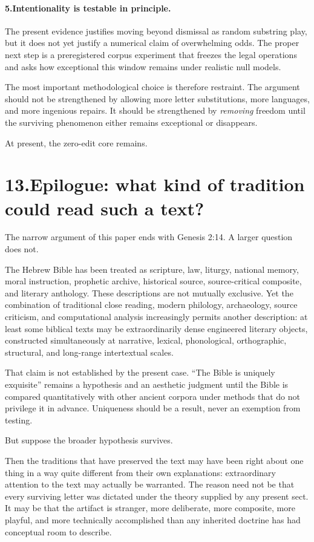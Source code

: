 \paragraph{5.\quad Intentionality is testable in principle.}
The present evidence justifies moving beyond dismissal as random substring play, but it does not yet justify a numerical claim of overwhelming odds.  The proper next step is a preregistered corpus experiment that freezes the legal operations and asks how exceptional this window remains under realistic null models.

The most important methodological choice is therefore restraint.  The argument should not be strengthened by allowing more letter substitutions, more languages, and more ingenious repairs.  It should be strengthened by \emph{removing} freedom until the surviving phenomenon either remains exceptional or disappears.

At present, the zero-edit core remains.

\section*{13.\quad Epilogue: what kind of tradition could read such a text?}

The narrow argument of this paper ends with Genesis 2:14.  A larger question does not.

The Hebrew Bible has been treated as scripture, law, liturgy, national memory, moral instruction, prophetic archive, historical source, source-critical composite, and literary anthology.  These descriptions are not mutually exclusive.  Yet the combination of traditional close reading, modern philology, archaeology, source criticism, and computational analysis increasingly permits another description: at least some biblical texts may be extraordinarily dense engineered literary objects, constructed simultaneously at narrative, lexical, phonological, orthographic, structural, and long-range intertextual scales.

That claim is not established by the present case.  ``The Bible is uniquely exquisite'' remains a hypothesis and an aesthetic judgment until the Bible is compared quantitatively with other ancient corpora under methods that do not privilege it in advance.  Uniqueness should be a result, never an exemption from testing.

But suppose the broader hypothesis survives.

Then the traditions that have preserved the text may have been right about one thing in a way quite different from their own explanations: extraordinary attention to the text may actually be warranted.  The reason need not be that every surviving letter was dictated under the theory supplied by any present sect.  It may be that the artifact is stranger, more deliberate, more composite, more playful, and more technically accomplished than any inherited doctrine has had conceptual room to describe.

